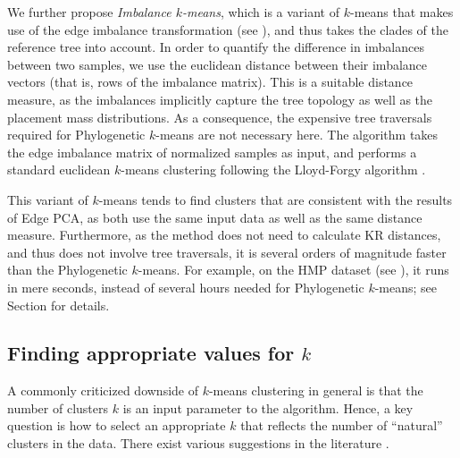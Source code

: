 We further propose \emph{Imbalance $k$-means},
which is a variant of $k$-means that makes use of the edge imbalance transformation
(see ),
and thus takes the clades of the reference tree into account.
In order to quantify the difference in imbalances between two samples,
we use the euclidean distance between their imbalance vectors (that is, rows of the imbalance matrix).
This is a suitable distance measure,
as the imbalances implicitly capture the tree topology as well as the placement mass distributions.
As a consequence, the expensive tree traversals required for Phylogenetic $k$-means are not necessary here.
The algorithm takes the edge imbalance matrix of normalized samples as input,
and performs a standard euclidean $k$-means clustering following the Lloyd-Forgy algorithm \cite{Lloyd1982,Forgy1965}.

This variant of $k$-means tends to find clusters that are consistent with the results of Edge PCA,
as both use the same input data as well as the same distance measure.
Furthermore, as the method does not need to calculate KR distances,
and thus does not involve tree traversals,
it is several orders of magnitude faster than the Phylogenetic $k$-means.
For example, on the \ac{HMP} dataset (see ),
it runs in mere seconds, instead of several hours needed for Phylogenetic $k$-means;
see Section  for details.


\subsection{Finding appropriate values for \texorpdfstring{$k$}{k}}
\label{ch:Clustering:sec:Methods:sub:FindingK}

A commonly criticized downside of $k$-means clustering in general is
that the number of clusters $k$ is an input parameter to the algorithm.
Hence, a key question is how to select an appropriate $k$
that reflects the number of ``natural'' clusters in the data.
There exist various suggestions in the literature
\cite{Thorndike1953,Rousseeuw1987,Bischof1999,Pelleg2000,Tibshirani2001,Hamerly2004}.

